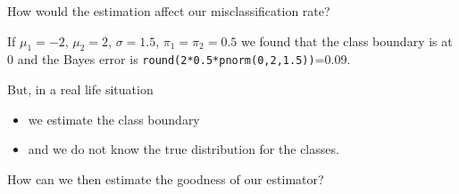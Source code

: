 \documentclass[10pt,ignorenonframetext,]{beamer}
\providecommand{\tightlist}{%
  \setlength{\itemsep}{0pt}\setlength{\parskip}{0pt}}
\begin{document}
\begin{frame}[fragile]

\begin{block}{How would the estimation affect our misclassification
rate?}

If \(\mu_1=-2\), \(\mu_2=2\), \(\sigma=1.5\), \(\pi_1=\pi_2=0.5\) we
found that the class boundary is at 0 and the Bayes error is
\texttt{round(2*0.5*pnorm(0,2,1.5))}=0.09.

But, in a real life situation

\begin{itemize}
\tightlist
\item
  we estimate the class boundary
\item
  and we do not know the true distribution for the classes.
\end{itemize}

How can we then estimate the goodness of our estimator?

\end{block}

\end{frame}
\end{document}
